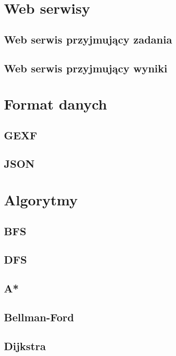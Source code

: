 \section{Web serwisy}
\label{sec:webservices}
\subsection{Web serwis przyjmujący zadania}

\subsection{Web serwis przyjmujący wyniki}

\section{Format danych}
\label{sec:data}

\subsection{GEXF}

\subsection{JSON}

\section{Algorytmy}

\subsection{BFS}

\subsection{DFS}

\subsection{A*}

\subsection{Bellman-Ford}

\subsection{Dijkstra}

